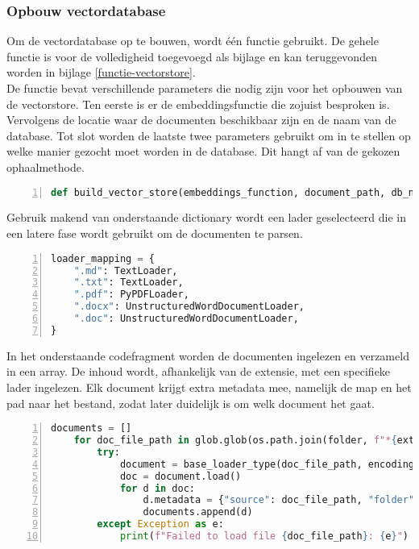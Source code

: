 \subsubsection{Opbouw vectordatabase}
Om de vectordatabase op te bouwen, wordt één functie gebruikt. De gehele functie is voor de volledigheid toegevoegd als bijlage en kan teruggevonden worden in bijlage \ref{functie-vectorstore}.
\\[1em]
De functie bevat verschillende parameters die nodig zijn voor het opbouwen van de vectorstore. Ten eerste is er de embeddingsfunctie die zojuist besproken is. Vervolgens de locatie waar de documenten beschikbaar zijn en de naam van de database. Tot slot worden de laatste twee parameters gebruikt om in te stellen op welke manier gezocht moet worden in de database. Dit hangt af van de gekozen ophaalmethode.

\begin{lstlisting}[basicstyle=\small, frame=single, breaklines=true, postbreak=\mbox{\textcolor{red}{$\hookrightarrow$}\space}, escapeinside ={\%,}, escapechar={!},
    numbers=left, language=Python, caption=Functie met parameters]
def build_vector_store(embeddings_function, document_path, db_name, search_type, search_kwargs):
\end{lstlisting}

Gebruik makend van onderstaande dictionary wordt een lader geselecteerd die in een latere fase wordt gebruikt om de documenten te parsen.

\begin{lstlisting}[basicstyle=\small, frame=single, breaklines=true, postbreak=\mbox{\textcolor{red}{$\hookrightarrow$}\space}, escapeinside ={\%,}, escapechar={!},
    numbers=left, language=Python, caption=Mapping van bestandsextensies naar de bijbehorende document loaders]
loader_mapping = {
    ".md": TextLoader,
    ".txt": TextLoader,
    ".pdf": PyPDFLoader,
    ".docx": UnstructuredWordDocumentLoader,
    ".doc": UnstructuredWordDocumentLoader,
}
\end{lstlisting}

In het onderstaande codefragment worden de documenten ingelezen en verzameld in een array. De inhoud wordt, afhankelijk van de extensie, met een specifieke lader ingelezen. Elk document krijgt extra metadata mee, namelijk de map en het pad naar het bestand, zodat later duidelijk is om welk document het gaat.

\begin{lstlisting}[basicstyle=\small, frame=single, breaklines=true, postbreak=\mbox{\textcolor{red}{$\hookrightarrow$}\space}, escapeinside ={\%,}, escapechar={!},
    numbers=left, language=Python, caption=Inladen en parsen van documenten per bestandstype met toevoeging van metadata]
    documents = []
    for doc_file_path in glob.glob(os.path.join(folder, f"*{ext}")):
        try:
            document = base_loader_type(doc_file_path, encoding="utf-8")
            doc = document.load()
            for d in doc:
                d.metadata = {"source": doc_file_path, "folder": folder}
                documents.append(d)
        except Exception as e:
            print(f"Failed to load file {doc_file_path}: {e}")
\end{lstlisting}

